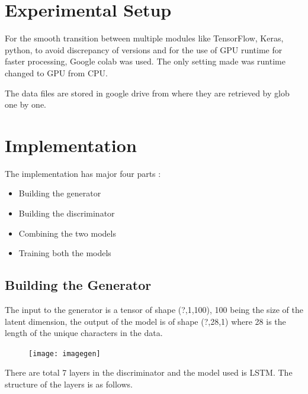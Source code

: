 \documentclass[oneside,12pt]{Classes/RoboticsLaTeX}
\begin{document}
\section{Experimental Setup}

For the smooth transition between multiple modules like TensorFlow, Keras, python, to avoid discrepancy of versions and for the use of GPU runtime for faster processing, Google colab was used. The only setting made was runtime changed to GPU from CPU. 

The data files are stored in google drive from where they are retrieved by glob one by one.
\section{Implementation}

The implementation has major four parts :

\begin{itemize}
  \item Building the generator
\end{itemize}

\begin{itemize}
  \item Building the discriminator
\end{itemize}

\begin{itemize}
  \item Combining the two models
\end{itemize}

\begin{itemize}
  \item Training both the models
\end{itemize}

\subsection{Building the Generator}

The input to the generator is a tensor of shape (?,1,100), 100 being the size of the latent dimension, the output of the model is of shape (?,28,1) where 28 is the length of the unique characters in the data.

\begin{figure}[H]
  \texttt{[image: imagegen]}
  \centering
\end{figure}


There are total 7 layers in the discriminator and the model used is LSTM. The structure of the layers is as follows.
\end{document}

